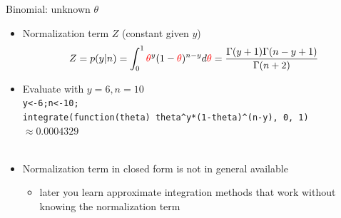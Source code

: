 \documentclass[english,t]{beamer}
\begin{document}
\begin{frame}{Binomial: unknown $\theta$}

  \begin{itemize}
  \item Normalization term $Z$ (constant given $y$)
    \begin{equation*}
      Z=p(y|n)= \int_0^1 {\color{red}\theta}^y(1-{\color{red}\theta})^{n-y} d{\color{red}\theta} = \frac{\Gamma(y+1)\Gamma(n-y+1)}{\Gamma(n+2)}
    \end{equation*}
  \item<2-> Evaluate with $y=6, n=10$\\
    {\scriptsize\texttt{y<-6;n<-10;\\integrate(function(theta) theta\^{}y*(1-theta)\^{}(n-y), 0, 1)} $\approx 0.0004329$}\\
    \\
  \item<4-> Normalization term in closed form is not in general available
    \begin{itemize}
    \item later you learn approximate integration methods that work
      without knowing the normalization term
    \end{itemize}
  \end{itemize}

\end{frame}

\end{document}
